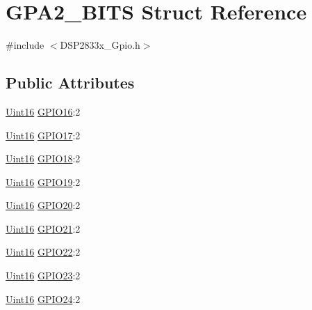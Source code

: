 \hypertarget{struct_g_p_a2___b_i_t_s}{}\section{G\+P\+A2\+\_\+\+B\+I\+T\+S Struct Reference}
\label{struct_g_p_a2___b_i_t_s}


{\ttfamily \#include $<$D\+S\+P2833x\+\_\+\+Gpio.\+h$>$}

\subsection*{Public Attributes}
\begin{DoxyCompactItemize}
\item 
\hyperlink{_d_s_p2833x___device_8h_a59a9f6be4562c327cbfb4f7e8e18f08b}{Uint16} \hyperlink{struct_g_p_a2___b_i_t_s_a461a9315ae7ce63640cc0ba48be955f5}{G\+P\+I\+O16}\+:2
\item 
\hyperlink{_d_s_p2833x___device_8h_a59a9f6be4562c327cbfb4f7e8e18f08b}{Uint16} \hyperlink{struct_g_p_a2___b_i_t_s_a9c5bf62bcb32ff8b1793c41dd5adc143}{G\+P\+I\+O17}\+:2
\item 
\hyperlink{_d_s_p2833x___device_8h_a59a9f6be4562c327cbfb4f7e8e18f08b}{Uint16} \hyperlink{struct_g_p_a2___b_i_t_s_a179e29eba3afc9bf5e13bd491e67f719}{G\+P\+I\+O18}\+:2
\item 
\hyperlink{_d_s_p2833x___device_8h_a59a9f6be4562c327cbfb4f7e8e18f08b}{Uint16} \hyperlink{struct_g_p_a2___b_i_t_s_a98b6380a48867540003bfc40335c8d87}{G\+P\+I\+O19}\+:2
\item 
\hyperlink{_d_s_p2833x___device_8h_a59a9f6be4562c327cbfb4f7e8e18f08b}{Uint16} \hyperlink{struct_g_p_a2___b_i_t_s_afec08dcba8a0d15f24487131a51190e3}{G\+P\+I\+O20}\+:2
\item 
\hyperlink{_d_s_p2833x___device_8h_a59a9f6be4562c327cbfb4f7e8e18f08b}{Uint16} \hyperlink{struct_g_p_a2___b_i_t_s_a4f703470c3d1a372a6e4ac830451c25e}{G\+P\+I\+O21}\+:2
\item 
\hyperlink{_d_s_p2833x___device_8h_a59a9f6be4562c327cbfb4f7e8e18f08b}{Uint16} \hyperlink{struct_g_p_a2___b_i_t_s_ada0a5dab59cb09565e66bf15d9e458f1}{G\+P\+I\+O22}\+:2
\item 
\hyperlink{_d_s_p2833x___device_8h_a59a9f6be4562c327cbfb4f7e8e18f08b}{Uint16} \hyperlink{struct_g_p_a2___b_i_t_s_a09dad0e58b557d26eec59c06a85bb9ba}{G\+P\+I\+O23}\+:2
\item 
\hyperlink{_d_s_p2833x___device_8h_a59a9f6be4562c327cbfb4f7e8e18f08b}{Uint16} \hyperlink{struct_g_p_a2___b_i_t_s_a5a452719bb05f7a563d6ca1d670988e4}{G\+P\+I\+O24}\+:2

\end{DoxyCompactItemize}
